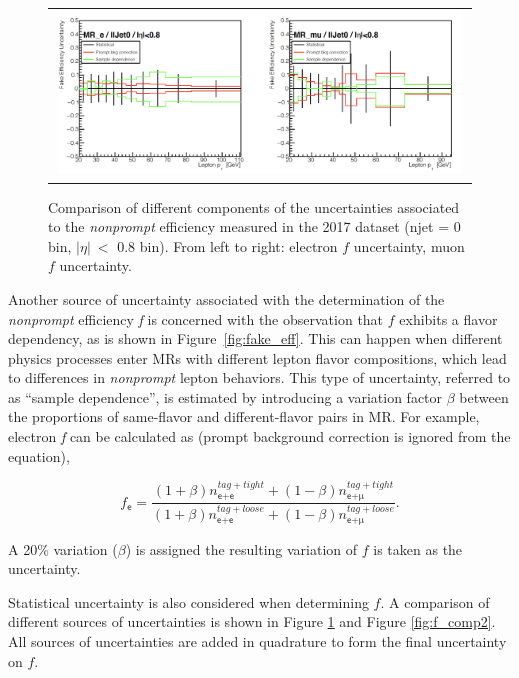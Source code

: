 \begin{figure}[tbh!]
 \begin{center}
 \begin{tabular}{c}
 \includegraphics[width=0.99\textwidth]{figures/Part3/Systematics/MR1}
 \end{tabular}
 \caption{Comparison of different components of the uncertainties associated to the \emph{nonprompt} efficiency measured in the 2017 dataset (njet = 0 bin, $|\eta|~<$ 0.8 bin). From left to right: electron $f$ uncertainty, muon $f$ uncertainty.}
 \label{fig:f_comp1}
 \end{center}
\end{figure}

Another source of uncertainty associated with the determination of the \emph{nonprompt} efficiency \emph{f} is concerned with the observation that $f$ exhibits a flavor dependency, as is shown in Figure~\ref{fig:fake_eff}. This can happen when different physics processes enter \acp{MR} with different lepton flavor compositions, which lead to differences in \emph{nonprompt} lepton behaviors. This type of uncertainty, referred to as ``sample dependence'', is estimated by introducing a variation factor $\beta$ between the proportions of same-flavor and different-flavor pairs in \ac{MR}. For example, electron \emph{f} can be calculated as (prompt background correction is ignored from the equation),

\begin{equation}
f_{\textsf{e}}=\frac{(1+\beta)n_{\textsf{e+e}}^{tag+tight}+(1-\beta)n_{\textsf{e+}\upmu}^{tag+tight}}{(1+\beta)n_{\textsf{e+e}}^{tag+loose}+(1-\beta)n_{\textsf{e+}\upmu}^{tag+loose}}.
 \label{eq:samp_dep}
\end{equation}

A 20$\%$ variation ($\beta$) is assigned the resulting variation of $f$ is taken as the uncertainty.
 
Statistical uncertainty is also considered when determining $f$. A comparison of different sources of uncertainties is shown in Figure \ref{fig:f_comp1} and Figure \ref{fig:f_comp2}. All sources of uncertainties are added in quadrature to form the final uncertainty on $f$. 

